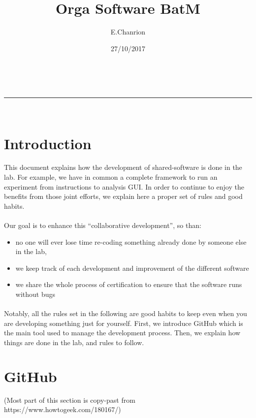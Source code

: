 \documentclass[a4paper,8pt]{article}
\makeatletter
\newcommand{\linia}{\rule{\linewidth}{0.5pt}}
\renewcommand{\maketitle}{
\begin{center}
\vspace{2ex}
{\huge \textsc{\@title}}
\vspace{1ex}
\\
\linia\\
\@author \hfill \@date
\vspace{4ex}
\end{center}
}
\makeatother
\begin{document}
\title{Orga Software BatM}

\author{E.Chanrion}

\date{27/10/2017}

\maketitle

\section{Introduction}

\paragraph{}
This document explains how the development of shared-software is done in the lab. For example, we have in common a complete framework to run an experiment from instructions to analysis GUI.
In order to continue to enjoy the benefits from those joint efforts, we explain here a proper set of rules and good habits. 

\paragraph{}
Our goal is to enhance this “collaborative development”, so than: 
\begin{itemize}
\item no one will ever lose time re-coding something already done by someone else in the lab, 
\item we keep track of each development and improvement of the different software
\item we share the whole process of certification to ensure that the software runs without bugs
\end{itemize}

\paragraph{}
Notably, all the rules set in the following are good habits to keep even when you are developing something just for yourself. First, we introduce GitHub which is the main tool used to manage the development process. Then, we explain how things are done in the lab, and rules to follow.


\section{GitHub}
(Most part of this section is copy-past from https://www.howtogeek.com/180167/)
\end{document}
